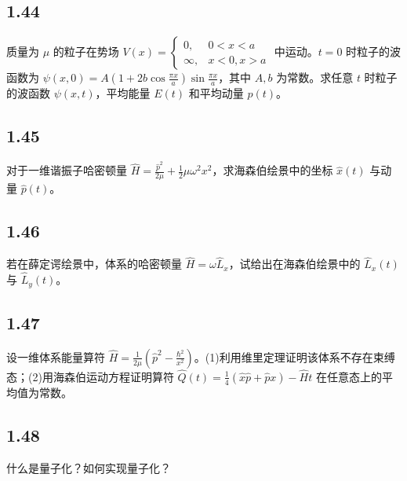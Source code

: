 \subsection{1.44}
质量为 $\mu$ 的粒子在势场 $V(x) = \begin{cases} 
0, & 0 < x < a \\ 
\infty, & x < 0, x > a 
\end{cases}$ 中运动。$t = 0$ 时粒子的波函数为 $\psi (x, 0) = A \left( 1 + 2b \cos \frac{\pi x}{a} \right) \sin \frac{\pi x}{a}$，其中 $A, b$ 为常数。求任意 $t$ 时粒子的波函数 $\psi (x, t)$，平均能量 $E(t)$ 和平均动量 $p(t)$。

\subsection{1.45}
对于一维谐振子哈密顿量 $\hat{H} = \frac{\hat{p}^2}{2\mu} + \frac{1}{2}\mu\omega^2 x^2$，求海森伯绘景中的坐标 $\hat{x}(t)$ 与动量 $\hat{p}(t)$。

\subsection{1.46}
若在薛定谔绘景中，体系的哈密顿量 $\hat{H} = \omega \hat{L}_x$，试给出在海森伯绘景中的 $\hat{L}_x(t)$ 与 $\hat{L}_y(t)$。

\subsection{1.47}
设一维体系能量算符 $\hat{H} = \frac{1}{2 \mu} \left( \hat{p}^2 - \frac{\hbar^2}{x^2} \right)$。(1)利用维里定理证明该体系不存在束缚态；(2)用海森伯运动方程证明算符 $\hat{Q}(t)=\frac{1}{4}(\hat{x}\hat{p}+\hat{p}x)-\hat{H}t$ 在任意态上的平均值为常数。

\subsection{1.48}
什么是量子化？如何实现量子化？